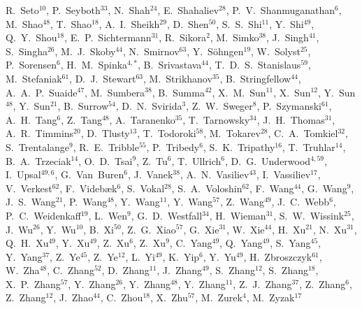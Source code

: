 {R.~Seto$^{10}$,
P.~Seyboth$^{33}$,
N.~Shah$^{24}$,
E.~Shahaliev$^{28}$,
P.~V.~Shanmuganathan$^{6}$,
M.~Shao$^{48}$,
T.~Shao$^{18}$,
A.~I.~Sheikh$^{29}$,
D.~Shen$^{50}$,
S.~S.~Shi$^{11}$,
Y.~Shi$^{49}$,
Q.~Y.~Shou$^{18}$,
E.~P.~Sichtermann$^{31}$,
R.~Sikora$^{2}$,
M.~Simko$^{38}$,
J.~Singh$^{41}$,
S.~Singha$^{26}$,
M.~J.~Skoby$^{44}$,
N.~Smirnov$^{63}$,
Y.~S\"{o}hngen$^{19}$,
W.~Solyst$^{25}$,
P.~Sorensen$^{6}$,
H.~M.~Spinka$^{4,*}$,
B.~Srivastava$^{44}$,
T.~D.~S.~Stanislaus$^{59}$,
M.~Stefaniak$^{61}$,
D.~J.~Stewart$^{63}$,
M.~Strikhanov$^{35}$,
B.~Stringfellow$^{44}$,
A.~A.~P.~Suaide$^{47}$,
M.~Sumbera$^{38}$,
B.~Summa$^{42}$,
X.~M.~Sun$^{11}$,
X.~Sun$^{12}$,
Y.~Sun$^{48}$,
Y.~Sun$^{21}$,
B.~Surrow$^{54}$,
D.~N.~Svirida$^{3}$,
Z.~W.~Sweger$^{8}$,
P.~Szymanski$^{61}$,
A.~H.~Tang$^{6}$,
Z.~Tang$^{48}$,
A.~Taranenko$^{35}$,
T.~Tarnowsky$^{34}$,
J.~H.~Thomas$^{31}$,
A.~R.~Timmins$^{20}$,
D.~Tlusty$^{13}$,
T.~Todoroki$^{58}$,
M.~Tokarev$^{28}$,
C.~A.~Tomkiel$^{32}$,
S.~Trentalange$^{9}$,
R.~E.~Tribble$^{55}$,
P.~Tribedy$^{6}$,
S.~K.~Tripathy$^{16}$,
T.~Truhlar$^{14}$,
B.~A.~Trzeciak$^{14}$,
O.~D.~Tsai$^{9}$,
Z.~Tu$^{6}$,
T.~Ullrich$^{6}$,
D.~G.~Underwood$^{4,59}$,
I.~Upsal$^{49,6}$,
G.~Van~Buren$^{6}$,
J.~Vanek$^{38}$,
A.~N.~Vasiliev$^{43}$,
I.~Vassiliev$^{17}$,
V.~Verkest$^{62}$,
F.~Videb{\ae}k$^{6}$,
S.~Vokal$^{28}$,
S.~A.~Voloshin$^{62}$,
F.~Wang$^{44}$,
G.~Wang$^{9}$,
J.~S.~Wang$^{21}$,
P.~Wang$^{48}$,
Y.~Wang$^{11}$,
Y.~Wang$^{57}$,
Z.~Wang$^{49}$,
J.~C.~Webb$^{6}$,
P.~C.~Weidenkaff$^{19}$,
L.~Wen$^{9}$,
G.~D.~Westfall$^{34}$,
H.~Wieman$^{31}$,
S.~W.~Wissink$^{25}$,
J.~Wu$^{26}$,
Y.~Wu$^{10}$,
B.~Xi$^{50}$,
Z.~G.~Xiao$^{57}$,
G.~Xie$^{31}$,
W.~Xie$^{44}$,
H.~Xu$^{21}$,
N.~Xu$^{31}$,
Q.~H.~Xu$^{49}$,
Y.~Xu$^{49}$,
Z.~Xu$^{6}$,
Z.~Xu$^{9}$,
C.~Yang$^{49}$,
Q.~Yang$^{49}$,
S.~Yang$^{45}$,
Y.~Yang$^{37}$,
Z.~Ye$^{45}$,
Z.~Ye$^{12}$,
L.~Yi$^{49}$,
K.~Yip$^{6}$,
Y.~Yu$^{49}$,
H.~Zbroszczyk$^{61}$,
W.~Zha$^{48}$,
C.~Zhang$^{52}$,
D.~Zhang$^{11}$,
J.~Zhang$^{49}$,
S.~Zhang$^{12}$,
S.~Zhang$^{18}$,
X.~P.~Zhang$^{57}$,
Y.~Zhang$^{26}$,
Y.~Zhang$^{48}$,
Y.~Zhang$^{11}$,
Z.~J.~Zhang$^{37}$,
Z.~Zhang$^{6}$,
Z.~Zhang$^{12}$,
J.~Zhao$^{44}$,
C.~Zhou$^{18}$,
X.~Zhu$^{57}$,
M.~Zurek$^{4}$,
M.~Zyzak$^{17}$
}

\address{\rm{(STAR Collaboration)}}

